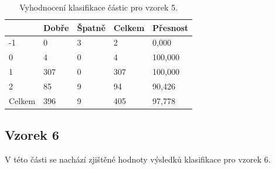 \documentclass[11pt,twoside,a4paper,table]{book}
\begin{document}
\begin{table}[h]
\begin{center}
\begin{tabular}{lllll}
\rowcolor[HTML]{9B9B9B} 
\multicolumn{1}{|l|}{\cellcolor[HTML]{9B9B9B}Třída} & \multicolumn{1}{l|}{\cellcolor[HTML]{9B9B9B}Dobře} & \multicolumn{1}{l|}{\cellcolor[HTML]{9B9B9B}Špatně}  & \multicolumn{1}{l|}{\cellcolor[HTML]{9B9B9B}Celkem} & \multicolumn{1}{l|}{\cellcolor[HTML]{9B9B9B}Přesnost} \\ \hline
\multicolumn{1}{|l|}{-1}                            & \multicolumn{1}{l|}{0}                             & \multicolumn{1}{l|}{3}                               & \multicolumn{1}{l|}{2}                              & \multicolumn{1}{l|}{0,000}                            \\ \hline
\multicolumn{1}{|l|}{0}                             & \multicolumn{1}{l|}{4}                             & \multicolumn{1}{l|}{0}                               & \multicolumn{1}{l|}{4}                              & \multicolumn{1}{l|}{100,000}                          \\ \hline
\multicolumn{1}{|l|}{1}                             & \multicolumn{1}{l|}{307}                           & \multicolumn{1}{l|}{0}                               & \multicolumn{1}{l|}{307}                            & \multicolumn{1}{l|}{100,000}                          \\ \hline
\multicolumn{1}{|l|}{2}                             & \multicolumn{1}{l|}{85}                            & \multicolumn{1}{l|}{9}                               & \multicolumn{1}{l|}{94}                             & \multicolumn{1}{l|}{90,426}                           \\ \hline
\multicolumn{1}{|l|}{Celkem}                        & \multicolumn{1}{l|}{396}                           & \multicolumn{1}{l|}{9}                               & \multicolumn{1}{l|}{405}                            & \multicolumn{1}{l|}{97,778}                           \\ \hline
\end{tabular}
\end{center}
\caption{Vyhodnocení klasifikace částic pro vzorek 5.}
\label{tab:classresult6}
\end{table}

\FloatBarrier
\subsection{Vzorek 6}
V této části se nachází zjištěné hodnoty výsledků klasifikace pro vzorek 6.
\end{document}
